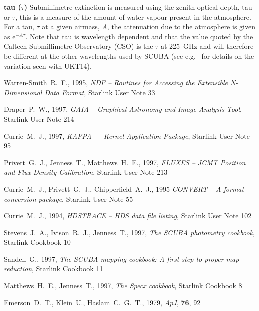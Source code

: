 \documentclass[twoside,11pt]{article}
\newcommand{\htmladdnormallink}[2]{#1}
\newcommand{\xref}[3]{#1}
\begin{document}
\begin{description}
\item{{\bf tau ($\tau$)}} Submillimetre extinction is measured using the
zenith optical depth, tau or $\tau$, this is a measure of the amount of water
vapour present in the atmosphere. For a tau, $\tau$ at a given airmass, $A$,
the attenuation due to the atmosphere is given as e$^{-A \tau}$. Note that tau
is wavelength dependent and that the value quoted by the 
\htmladdnormallink{Caltech Submillimetre Observatory}{http://www.cco.caltech.edu/\~{}cso/} (CSO) is the $\tau$ at 225~GHz and will therefore be different at
the other wavelengths used by SCUBA (see e.g.\ \cite{SR94} for details on the
variation seen with UKT14).

\end{description}

\clearpage
\begin{thebibliography}{}

Warren-Smith~R.~F., 1995, {\it NDF -- Routines for Accessing the Extensible
N-Dimensional Data Format}, \xref{Starlink User Note 33}{sun33}{}

Draper~P.~W., 1997, {\it GAIA -- Graphical Astronomy and Image Analysis Tool},
\xref{Starlink User Note 214}{sun214}{}

Currie~M.~J., 1997, {\it KAPPA --- Kernel Application Package},
\xref{Starlink User Note 95}{sun95}{}

Privett~G.~J., Jenness~T., Matthews~H.~E., 1997, {\it FLUXES --
JCMT Position and Flux Density Calibration}, 
\xref{Starlink User Note 213}{sun213}{}

Currie~M.~J., Privett~G.~J., Chipperfield~A.~J., 1995 {\it CONVERT --
A format-conversion package}, \xref{Starlink User Note 55}{sun55}{}

Currie~M.~J., 1994, {\it HDSTRACE -- HDS data file listing}, 
\xref{Starlink User Note 102}{sun102}{}

Stevens~J.~A., Ivison~R.~J., Jenness~T., 1997, {\it The SCUBA photometry 
cookbook},
\xref{Starlink Cookbook 10}{sc10}{}

Sandell~G., 1997, {\it The SCUBA mapping cookbook: A first step to
proper map reduction}, \xref{Starlink Cookbook 11}{sc11}{}

Matthews~H.~E., Jenness~T., 1997,
\textit{The Specx cookbook}, \xref{Starlink Cookbook 8}{sc8}{}

Emerson~D.~T., Klein~U., Haslam~C.~G.~T., 1979, {\it ApJ}, {\bf 76}, 92


\end{thebibliography}
\end{document}
